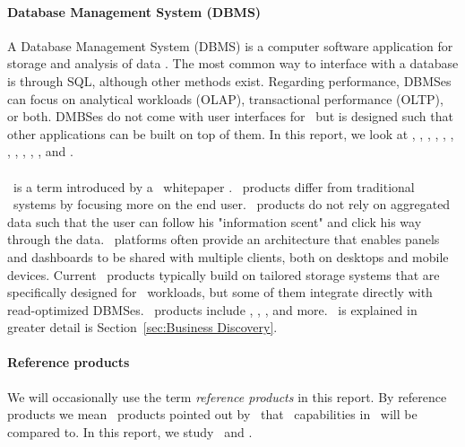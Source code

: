 \paragraph{Database Management System (DBMS)}
\label{par:Database Management System (DBMS)}
A Database Management System (DBMS) is a computer software application for storage and analysis of data \cite{Wikipedia_contributors2015-pb}. The most common way to interface with a database is through SQL, although other methods exist. Regarding performance, DBMSes can focus on analytical workloads (OLAP), transactional performance (OLTP), or both. DMBSes do not come with user interfaces for \bd~but is designed such that other applications can be built on top of them. In this report, we look at \oracle, \ibm, \saph, \sapnw, \mssql, \cstore, \vertica, \blink, \exasol, \oracle, \hyper, and \hyrise.

\paragraph{\bd}
\label{par:Business Discovery}
\bd~is a term introduced by a \qlikview~whitepaper \cite{Qlik2014-vd}. \bd~products differ from traditional \bi~systems by focusing more on the end user. \bd~products do not rely on aggregated data such that the user can follow his "information scent" and click his way through the data. \bd~platforms often provide an architecture that enables panels and dashboards to be shared with multiple clients, both on desktops and mobile devices. Current \bd~products typically build on tailored storage systems that are specifically designed for \bd~workloads, but some of them integrate directly with read-optimized DBMSes. \bd~products include \tableau, \qlikview, \powerpivot, and more. \bd~is explained in greater detail is Section~\ref{sec:Business Discovery}.

\paragraph{Reference products}
\label{par:Reference products}
We will occasionally use the term \textit{reference products} in this report. By reference products we mean \bd~products pointed out by \genus~that \bd~capabilities in \genusSoftware~will be compared to. In this report, we study \qlikview~and \tableau.


